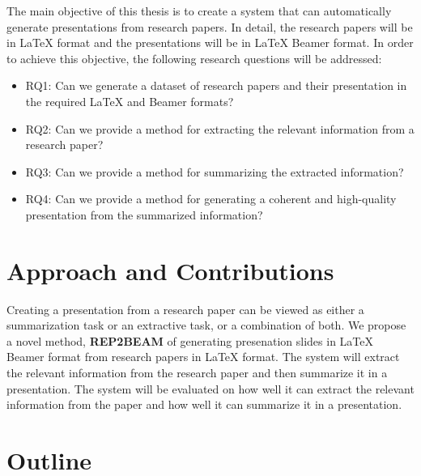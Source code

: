 The main objective of this thesis is to create a system that can automatically generate presentations from research papers. In detail, the research papers will be in \LaTeX{} format and the presentations will be in \LaTeX{} Beamer format. In order to achieve this objective, the following research questions will be addressed:

\begin{itemize}
  \item RQ1: Can we generate a dataset of research papers and their presentation in the required \LaTeX{} and Beamer formats?
  \item RQ2: Can we provide a method for extracting the relevant information from a research paper?
  \item RQ3: Can we provide a method for summarizing the extracted information?
  \item RQ4: Can we provide a method for generating a coherent and high-quality presentation from the summarized information?
\end{itemize}

\section{Approach and Contributions}
\label{sec:intro:approach}


Creating a presentation from a research paper can be viewed as either a summarization task or an extractive task, or a combination of both. We propose a novel method, \textbf{REP2BEAM} of generating presenation slides in \LaTeX{} Beamer format from research papers in \LaTeX{} format. The system will extract the relevant information from the research paper and then summarize it in a presentation. The system will be evaluated on how well it can extract the relevant information from the paper and how well it can summarize it in a presentation.


\section{Outline}
\label{sec:intro:outline}

